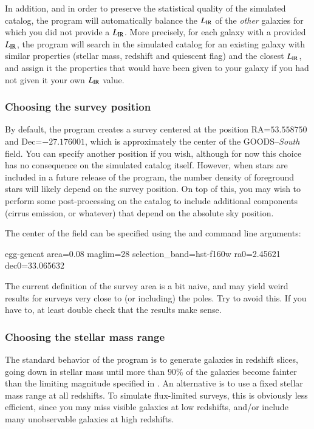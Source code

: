 In addition, and in order to preserve the statistical quality of the simulated catalog, the program will automatically balance the $L_{\rm IR}$ of the \emph{other} galaxies for which you did not provide a $L_{\rm IR}$. More precisely, for each galaxy with a provided $L_{\rm IR}$, the program will search in the simulated catalog for an existing galaxy with similar properties (stellar mass, redshift and quiescent flag) and the closest $L_{\rm IR}$, and assign it the properties that would have been given to your galaxy if you had not given it your own $L_{\rm IR}$ value.

\subsubsection{Choosing the survey position}

By default, the program creates a survey centered at the position RA=$53.558750$ and Dec=$-27.176001$, which is approximately the center of the GOODS--{\it South} field. You can specify another position if you wish, although for now this choice has no consequence on the simulated catalog itself. However, when stars are included in a future release of the program, the number density of foreground stars will likely depend on the survey position. On top of this, you may wish to perform some post-processing on the catalog to include additional components (cirrus emission, or whatever) that depend on the absolute sky position.

The center of the field can be specified using the  and  command line arguments:
\begin{bashcode}
egg-gencat area=0.08 maglim=28 selection_band=hst-f160w ra0=2.45621 dec0=33.065632
\end{bashcode}
The current definition of the survey area is a bit naive, and may yield weird results for surveys very close to (or including) the poles. Try to avoid this. If you have to, at least double check that the results make sense.


\subsubsection{Choosing the stellar mass range}

The standard behavior of the program is to generate galaxies in redshift slices, going down in stellar mass until more than $90\%$ of the galaxies become fainter than the limiting magnitude specified in . An alternative is to use a fixed stellar mass range at all redshifts. To simulate flux-limited surveys, this is obviously less efficient, since you may miss visible galaxies at low redshifts, and/or include many unobservable galaxies at high redshifts.

